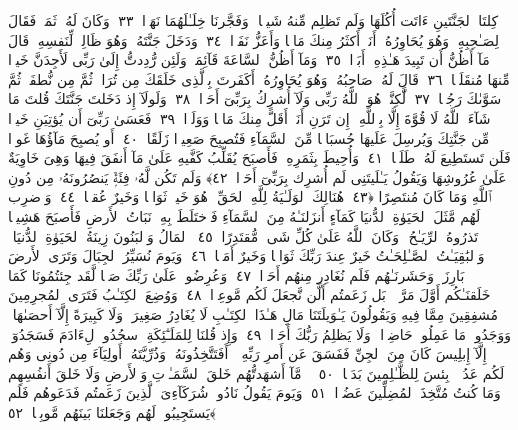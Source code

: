 كِلتَا ٱلجَنَّتَينِ ءَاتَت أُكُلَهَا وَلَم تَظلِم مِّنهُ شَيـًۭٔا ۚ وَفَجَّرنَا خِلَـٰلَهُمَا نَهَرًۭا ﴿٣٣﴾
 وَكَانَ لَهُۥ ثَمَرٌۭ فَقَالَ لِصَـٰحِبِهِۦ وَهُوَ يُحَاوِرُهُۥٓ أَنَا۠ أَكثَرُ مِنكَ مَالًۭا وَأَعَزُّ نَفَرًۭا ﴿٣٤﴾
 وَدَخَلَ جَنَّتَهُۥ وَهُوَ ظَالِمٌۭ لِّنَفسِهِۦ قَالَ مَآ أَظُنُّ أَن تَبِيدَ هَـٰذِهِۦٓ أَبَدًۭا ﴿٣٥﴾
 وَمَآ أَظُنُّ ٱلسَّاعَةَ قَآئِمَةًۭ وَلَئِن رُّدِدتُّ إِلَىٰ رَبِّى لَأَجِدَنَّ خَيرًۭا مِّنهَا مُنقَلَبًۭا ﴿٣٦﴾
 قَالَ لَهُۥ صَاحِبُهُۥ وَهُوَ يُحَاوِرُهُۥٓ أَكَفَرتَ بِٱلَّذِى خَلَقَكَ مِن تُرَابٍۢ ثُمَّ مِن نُّطفَةٍۢ ثُمَّ سَوَّىٰكَ رَجُلًۭا ﴿٣٧﴾
 لَّٰكِنَّا۠ هُوَ ٱللَّهُ رَبِّى وَلَآ أُشرِكُ بِرَبِّىٓ أَحَدًۭا ﴿٣٨﴾
 وَلَولَآ إِذ دَخَلتَ جَنَّتَكَ قُلتَ مَا شَآءَ ٱللَّهُ لَا قُوَّةَ إِلَّا بِٱللَّهِ ۚ إِن تَرَنِ أَنَا۠ أَقَلَّ مِنكَ مَالًۭا وَوَلَدًۭا ﴿٣٩﴾
 فَعَسَىٰ رَبِّىٓ أَن يُؤتِيَنِ خَيرًۭا مِّن جَنَّتِكَ وَيُرسِلَ عَلَيهَا حُسبَانًۭا مِّنَ ٱلسَّمَآءِ فَتُصبِحَ صَعِيدًۭا زَلَقًا ﴿٤٠﴾
 أَو يُصبِحَ مَآؤُهَا غَورًۭا فَلَن تَستَطِيعَ لَهُۥ طَلَبًۭا ﴿٤١﴾
 وَأُحِيطَ بِثَمَرِهِۦ فَأَصبَحَ يُقَلِّبُ كَفَّيهِ عَلَىٰ مَآ أَنفَقَ فِيهَا وَهِىَ خَاوِيَةٌ عَلَىٰ عُرُوشِهَا وَيَقُولُ يَـٰلَيتَنِى لَم أُشرِك بِرَبِّىٓ أَحَدًۭا ﴿٤٢﴾
 وَلَم تَكُن لَّهُۥ فِئَةٌۭ يَنصُرُونَهُۥ مِن دُونِ ٱللَّهِ وَمَا كَانَ مُنتَصِرًا ﴿٤٣﴾
 هُنَالِكَ ٱلوَلَـٰيَةُ لِلَّهِ ٱلحَقِّ ۚ هُوَ خَيرٌۭ ثَوَابًۭا وَخَيرٌ عُقبًۭا ﴿٤٤﴾
 وَٱضرِب لَهُم مَّثَلَ ٱلحَيَوٰةِ ٱلدُّنيَا كَمَآءٍ أَنزَلنَـٰهُ مِنَ ٱلسَّمَآءِ فَٱختَلَطَ بِهِۦ نَبَاتُ ٱلأَرضِ فَأَصبَحَ هَشِيمًۭا تَذرُوهُ ٱلرِّيَـٰحُ ۗ وَكَانَ ٱللَّهُ عَلَىٰ كُلِّ شَىءٍۢ مُّقتَدِرًا ﴿٤٥﴾
 ٱلمَالُ وَٱلبَنُونَ زِينَةُ ٱلحَيَوٰةِ ٱلدُّنيَا ۖ وَٱلبَٰقِيَـٰتُ ٱلصَّـٰلِحَـٰتُ خَيرٌ عِندَ رَبِّكَ ثَوَابًۭا وَخَيرٌ أَمَلًۭا ﴿٤٦﴾
 وَيَومَ نُسَيِّرُ ٱلجِبَالَ وَتَرَى ٱلأَرضَ بَارِزَةًۭ وَحَشَرنَـٰهُم فَلَم نُغَادِر مِنهُم أَحَدًۭا ﴿٤٧﴾
 وَعُرِضُوا۟ عَلَىٰ رَبِّكَ صَفًّۭا لَّقَد جِئتُمُونَا كَمَا خَلَقنَـٰكُم أَوَّلَ مَرَّةٍۭ ۚ بَل زَعَمتُم أَلَّن نَّجعَلَ لَكُم مَّوعِدًۭا ﴿٤٨﴾
 وَوُضِعَ ٱلكِتَـٰبُ فَتَرَى ٱلمُجرِمِينَ مُشفِقِينَ مِمَّا فِيهِ وَيَقُولُونَ يَـٰوَيلَتَنَا مَالِ هَـٰذَا ٱلكِتَـٰبِ لَا يُغَادِرُ صَغِيرَةًۭ وَلَا كَبِيرَةً إِلَّآ أَحصَىٰهَا ۚ وَوَجَدُوا۟ مَا عَمِلُوا۟ حَاضِرًۭا ۗ وَلَا يَظلِمُ رَبُّكَ أَحَدًۭا ﴿٤٩﴾
 وَإِذ قُلنَا لِلمَلَـٰٓئِكَةِ ٱسجُدُوا۟ لِءَادَمَ فَسَجَدُوٓا۟ إِلَّآ إِبلِيسَ كَانَ مِنَ ٱلجِنِّ فَفَسَقَ عَن أَمرِ رَبِّهِۦٓ ۗ أَفَتَتَّخِذُونَهُۥ وَذُرِّيَّتَهُۥٓ أَولِيَآءَ مِن دُونِى وَهُم لَكُم عَدُوٌّۢ ۚ بِئسَ لِلظَّـٰلِمِينَ بَدَلًۭا ﴿٥٠﴾
 ۞ مَّآ أَشهَدتُّهُم خَلقَ ٱلسَّمَـٰوَٟتِ وَٱلأَرضِ وَلَا خَلقَ أَنفُسِهِم وَمَا كُنتُ مُتَّخِذَ ٱلمُضِلِّينَ عَضُدًۭا ﴿٥١﴾
 وَيَومَ يَقُولُ نَادُوا۟ شُرَكَآءِىَ ٱلَّذِينَ زَعَمتُم فَدَعَوهُم فَلَم يَستَجِيبُوا۟ لَهُم وَجَعَلنَا بَينَهُم مَّوبِقًۭا ﴿٥٢﴾
